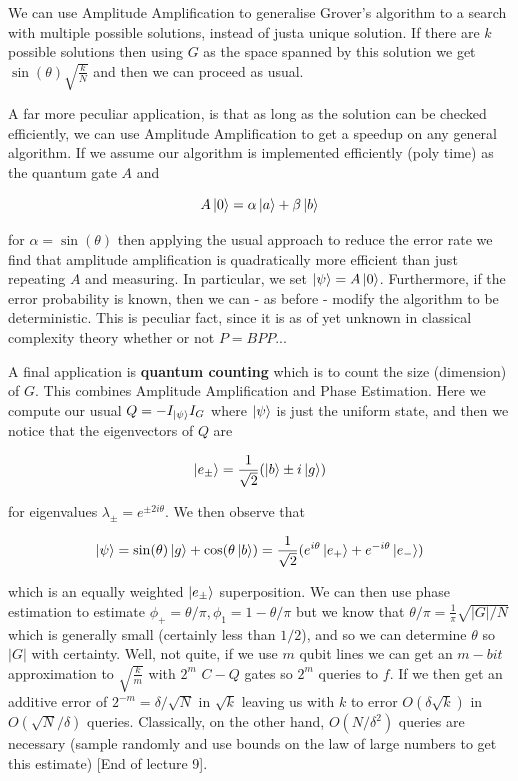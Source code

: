 \documentclass{article}
\theoremstyle{definition}
\begin{document}
We can use Amplitude Amplification to generalise Grover's algorithm to a search
with multiple possible solutions, instead of justa  unique solution. If there
are $k$ possible solutions then using $G$ as the space spanned by this solution
we get $\sin(\theta) \sqrt{\frac{k}{N}}$ and then we can proceed as usual.

A far more peculiar application, is that as long as the solution can be checked
efficiently, we can use Amplitude Amplification to get a speedup on any general
algorithm. If we assume our algorithm is implemented efficiently (poly time) as
the quantum gate $A$ and

$$ A\ket{0} = \alpha \ket{a} + \beta \ket{b} $$

for $\alpha = \sin(\theta)$ then applying the usual approach to reduce the error
rate we find that amplitude amplification is quadratically more efficient than
just repeating $A$ and measuring. In particular, we set $\ket{\psi} = A
\ket{0}$. Furthermore, if the error probability is known, then we can - as
before - modify the algorithm to be deterministic. This is peculiar fact, since
it is as of yet unknown in classical complexity theory whether or not $P =
BPP$...

A final application is \textbf{quantum counting} which is to count the size
(dimension) of $G$. This combines Amplitude Amplification and Phase Estimation.
Here we compute our usual $Q = -I_{\ket{\psi}} I_G$ where $\ket{\psi}$ is just
the uniform state, and then we notice that the eigenvectors of $Q$ are

$$ \ket{e_\pm} = \frac{1}{\sqrt{2}} (\ket{b} \pm i \ket{g}) $$

for eigenvalues $\lambda_\pm = e^{\pm 2i \theta}$. We then observe that

$$ \ket{\psi} = \sin(\theta) \ket{g} + \cos(\theta \ket{b}) = \frac{1}{\sqrt{2}}
(e^{i\theta} \ket{e_+} + e^{-i \theta} \ket{e_-}) $$

which is an equally weighted $\ket{e_\pm}$ superposition. We can then use phase
estimation to estimate $\phi_+ = \theta / \pi, \phi_1 = 1 - \theta / \pi$ but we
know that $\theta / \pi = \frac{1}{\pi} \sqrt{|G| / N}$ which is generally small
(certainly less than $1/2$), and so we can determine $\theta$ so $|G|$ with
certainty. Well, not quite, if we use $m$ qubit lines we can get an $m-bit$
approximation to $\sqrt{\frac{k}{m}}$ with $2^m$ $C-Q$ gates so $2^m$ queries to
$f$. If we then get an additive error of $2^{-m} = \delta / \sqrt{N}$ in
$\sqrt{k}$ leaving us with $k$ to error $O(\delta \sqrt{k})$ in $O(\sqrt{N} /
\delta)$ queries. Classically, on the other hand, $O(N / \delta^2)$ queries are
necessary (sample randomly and use bounds on the law of large numbers to get
this estimate) [End of lecture 9].
\end{document}
